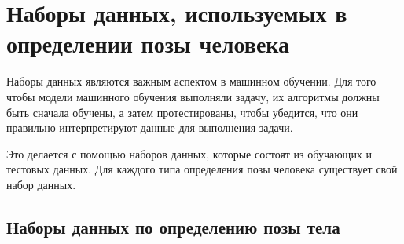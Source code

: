 \section{Наборы данных, используемых в определении позы человека}

Наборы данных являются важным аспектом в машинном обучении. Для того чтобы модели машинного обучения выполняли задачу, их алгоритмы должны быть сначала обучены, а затем протестированы, чтобы убедится, что они правильно интерпретируют данные для выполнения задачи.

Это делается с помощью наборов данных, которые состоят из обучающих и тестовых данных. 
Для каждого типа определения позы человека существует свой набор данных.

\subsection{Наборы данных по определению позы тела}


